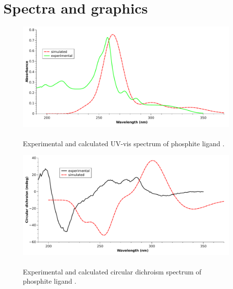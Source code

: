 \chapter{Spectra and graphics}





\ifpdf
\begin{figure}%
 \centering
 \includegraphics[width=1\textwidth]{sp/uvvis-sper-calc.pdf}
  \caption{\\Experimental and calculated UV-vis spectrum of phosphite ligand .\label{sp:uvvis-legante}}
\end{figure}
\begin{figure}%
 \centering
 \includegraphics[width=1\textwidth]{sp/cd-sper-calc.pdf}
  \caption{\\Experimental and calculated circular dichroism spectrum of phosphite ligand .\label{sp:cd-legante}}
\end{figure}
\else
\fignoeps
\fi





